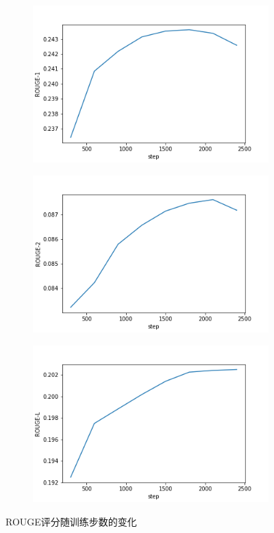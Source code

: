 \documentclass[10pt,a4paper]{article}
\begin{document}
\begin{figure}[H]
  \centering
  \begin{subfigure}{0.3\textwidth}
    \centering
    \includegraphics[width=\textwidth]{fig/rouge1.png}
  \end{subfigure}
  \hfill
  \begin{subfigure}{0.3\textwidth}
    \centering
    \includegraphics[width=\textwidth]{fig/rouge2.png}
  \end{subfigure}
  \hfill
  \begin{subfigure}{0.3\textwidth}
    \centering
    \includegraphics[width=\textwidth]{fig/rougel.png}
  \end{subfigure}
  \caption{ROUGE评分随训练步数的变化}\label{fig:rouge}
\end{figure}
\end{document}
